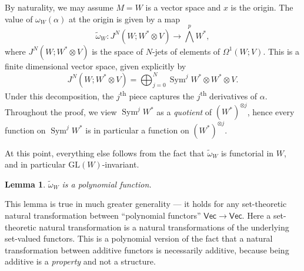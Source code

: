 \documentclass{shortart}
\newtheorem{lemma}[thm]{Lemma}
\theoremstyle{definition}
\DeclareMathOperator\Sym{Sym}
\newcommand\Vect{\mathsf{Vec}}
\newcommand\GL{\mathrm{GL}}
\newcommand\exterior{{\textstyle \bigwedge}}
\begin{document}
By naturality, we may assume $M = W$ is a vector space and $x$ is the origin. The value of $\omega_W(\alpha)$ at the origin is given by a map
\[
  \tilde{\omega}_W: J^N(W; W^* \otimes V) \to \exterior^p W^*,
\]
where $J^N(W; W^* \otimes V)$ is the space of $N$-jets of elements of $\Omega^1(W; V)$. This is a finite dimensional vector space, given explicitly by
\[
  J^N(W; W^* \otimes V) = \bigoplus_{j = 0}^N \Sym^j W^* \otimes W^* \otimes V.
\]
Under this decomposition, the $j$\textsuperscript{th} piece captures the $j$\textsuperscript{th} derivatives of $\alpha$. Throughout the proof, we view $\Sym^j W^*$ as a \emph{quotient} of $(W^*)^{\otimes j}$, hence every function on $\Sym^j W^*$ is in particular a function on $(W^*)^{\otimes j}$.

At this point, everything else follows from the fact that $\tilde{\omega}_W$ is functorial in $W$, and in particular $\GL(W)$-invariant.
\begin{lemma}
  $\tilde{\omega}_W$ is a polynomial function.
\end{lemma}

This lemma is true in much greater generality --- it holds for any set-theoretic natural transformation between ``polynomial functors'' $\Vect \to \Vect$. Here a set-theoretic natural transformation is a natural transformations of the underlying set-valued functors. This is a polynomial version of the fact that a natural transformation between additive functors is necessarily additive, because being additive is a \emph{property} and not a structure.
\end{document}
